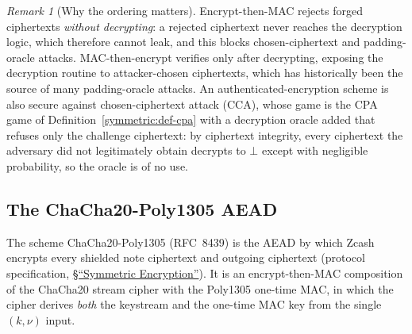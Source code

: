 \documentclass[11pt,a4paper]{article}
\theoremstyle{definition}
\theoremstyle{remark}
\newtheorem{remark}[theorem]{Remark}
\begin{document}
\begin{remark}[Why the ordering matters]\label{symmetric:rem-etm}
Encrypt-then-MAC rejects forged ciphertexts \emph{without
decrypting}: a rejected ciphertext never reaches the decryption
logic, which therefore cannot leak, and this blocks chosen-ciphertext
and padding-oracle attacks. MAC-then-encrypt verifies only after
decrypting, exposing the decryption routine to attacker-chosen
ciphertexts, which has historically been the source of many
padding-oracle attacks. An authenticated-encryption scheme is also
secure against chosen-ciphertext attack (CCA), whose game is the CPA
game of Definition~\ref{symmetric:def-cpa} with a decryption oracle
added that refuses only the challenge ciphertext: by ciphertext
integrity, every ciphertext the adversary did not legitimately obtain
decrypts to \(\bot\) except with negligible probability, so the oracle
is of no use.
\end{remark}

\subsection{The ChaCha20-Poly1305 AEAD}
\label{symmetric:subsec:chachapoly}

The scheme \textsf{ChaCha20-Poly1305} (RFC~8439) is the AEAD by which Zcash
encrypts every shielded note ciphertext and outgoing ciphertext
(protocol specification,
\href{https://zips.z.cash/protocol/protocol.pdf\#concretesym}{\S``Symmetric Encryption''}). It is an
encrypt-then-MAC composition of the \textsf{ChaCha20} stream cipher
with the \textsf{Poly1305} one-time MAC, in which the cipher derives
\emph{both} the keystream and the one-time MAC key from the single
\((k, \nu)\) input.
\end{document}
